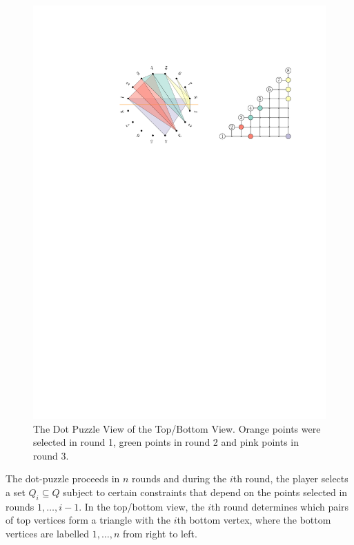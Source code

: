 \documentclass{patmorin}
\begin{document}
\begin{figure}
   \begin{center}
      \includegraphics{figs/point-view}
   \end{center}
   \caption{The Dot Puzzle View of the Top/Bottom View. Orange points were
     selected in round 1, green points in round 2 and pink points in round 3.}
\end{figure}

The dot-puzzle proceeds in $n$ rounds and during the $i$th round, the
player selects a set $Q_i\subseteq Q$ subject to certain constraints
that depend on the points selected in rounds $1,\ldots,i-1$.  In the
top/bottom view, the $i$th round determines which pairs of top vertices
form a triangle with the $i$th bottom vertex, where the bottom
vertices are labelled $1,\ldots,n$ from right to left.  
\end{document}
